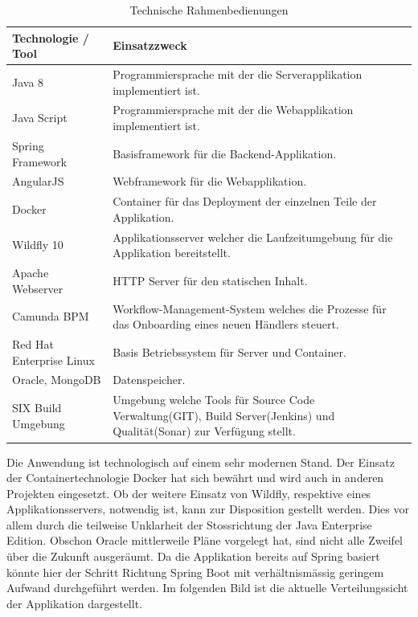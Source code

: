 \begin{table}[H]
	\centering
	\caption{Technische Rahmenbedienungen}
	\begin{tabular}{ | p{4cm} | p{10cm} | }
		\toprule
		{\textbf{Technologie / Tool}} & {\textbf{Einsatzzweck}} \\
		\midrule
		Java 8 & Programmiersprache mit der die Serverapplikation implementiert ist. \\ \hline
		Java Script & Programmiersprache mit der die Webapplikation implementiert ist. \\ \hline
		Spring Framework & Basisframework für die Backend-Applikation.  \\ \hline
		AngularJS & Webframework für die Webapplikation. \\ \hline
		Docker & Container für das Deployment der einzelnen Teile der Applikation. \\ \hline
		Wildfly 10 & Applikationsserver welcher die Laufzeitumgebung für die Applikation bereitstellt. \\ \hline
		Apache Webserver & HTTP Server für den statischen Inhalt. \\ \hline
		Camunda BPM & Workflow-Management-System welches die Prozesse für das Onboarding eines neuen Händlers steuert. \\ \hline
		Red Hat Enterprise Linux & Basis Betriebssystem für Server und Container.\\ \hline
		Oracle, MongoDB & Datenspeicher. \\ \hline
		SIX Build Umgebung & Umgebung welche Tools für Source Code Verwaltung(GIT), Build Server(Jenkins) und Qualität(Sonar) zur Verfügung stellt.\\
		\bottomrule
	\end{tabular}
\end{table}
Die Anwendung ist technologisch auf einem sehr modernen Stand. Der Einsatz der Containertechnologie Docker hat sich bewährt und wird auch in anderen Projekten eingesetzt. Ob der weitere Einsatz von Wildfly, respektive eines Applikationsservers, notwendig ist, kann zur Disposition gestellt werden. Dies vor allem durch die teilweise Unklarheit der Stossrichtung der Java Enterprise Edition. Obschon Oracle mittlerweile Pläne vorgelegt hat, sind nicht alle Zweifel über die Zukunft ausgeräumt. Da die Applikation bereits auf Spring basiert könnte hier der Schritt Richtung Spring Boot mit verhältnismässig geringem Aufwand durchgeführt werden. Im folgenden Bild ist die aktuelle Verteilungssicht der Applikation dargestellt.
